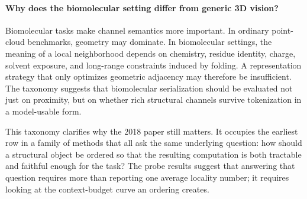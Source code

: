 \paragraph{Why does the biomolecular setting differ from generic 3D vision?}
Biomolecular tasks make channel semantics more important. In ordinary point-cloud benchmarks, geometry may dominate. In biomolecular settings, the meaning of a local neighborhood depends on chemistry, residue identity, charge, solvent exposure, and long-range constraints induced by folding. A representation strategy that only optimizes geometric adjacency may therefore be insufficient. The taxonomy suggests that biomolecular serialization should be evaluated not just on proximity, but on whether rich structural channels survive tokenization in a model-usable form.

This taxonomy clarifies why the 2018 paper still matters. It occupies the earliest row in a family of methods that all ask the same underlying question: how should a structural object be ordered so that the resulting computation is both tractable and faithful enough for the task? The probe results suggest that answering that question requires more than reporting one average locality number; it requires looking at the context-budget curve an ordering creates.
